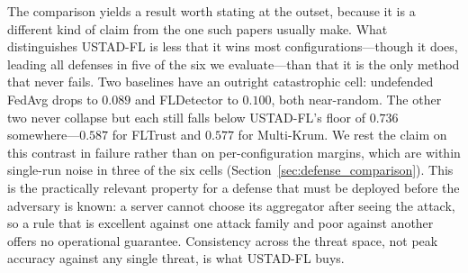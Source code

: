\documentclass[journal]{IEEEtran}
\begin{document}
The comparison yields a result worth stating at the outset, because it is a different kind of claim from the one such papers usually make. What distinguishes USTAD-FL is less that it wins most configurations---though it does, leading all defenses in five of the six we evaluate---than that it is the only method that never fails. Two baselines have an outright catastrophic cell: undefended FedAvg drops to $0.089$ and FLDetector to $0.100$, both near-random. The other two never collapse but each still falls below USTAD-FL's floor of $0.736$ somewhere---$0.587$ for FLTrust and $0.577$ for Multi-Krum. We rest the claim on this contrast in failure rather than on per-configuration margins, which are within single-run noise in three of the six cells (Section~\ref{sec:defense_comparison}). This is the practically relevant property for a defense that must be deployed before the adversary is known: a server cannot choose its aggregator after seeing the attack, so a rule that is excellent against one attack family and poor against another offers no operational guarantee. Consistency across the threat space, not peak accuracy against any single threat, is what USTAD-FL buys.
\end{document}
